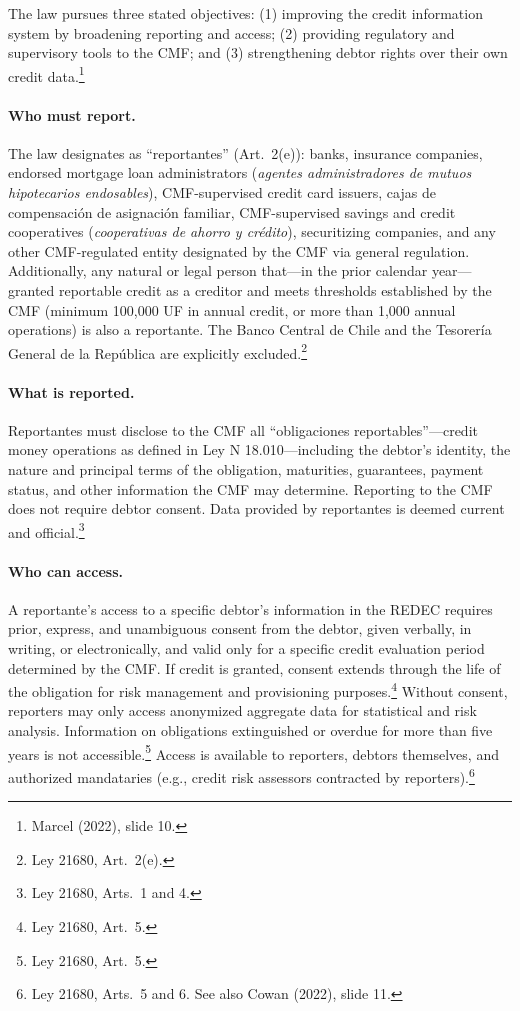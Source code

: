 \documentclass[12pt]{article}
\theoremstyle{plain}
\theoremstyle{plain}
\begin{document}
The law pursues three stated objectives: (1) improving the credit information system by broadening reporting and access; (2) providing regulatory and supervisory tools to the CMF; and (3) strengthening debtor rights over their own credit data.\footnote{Marcel (2022), slide 10.}

\paragraph{Who must report.} The law designates as ``reportantes'' (Art.\ 2(e)): banks, insurance companies, endorsed mortgage loan administrators (\textit{agentes administradores de mutuos hipotecarios endosables}), CMF-supervised credit card issuers, cajas de compensaci\'on de asignaci\'on familiar, CMF-supervised savings and credit cooperatives (\textit{cooperativas de ahorro y cr\'edito}), securitizing companies, and any other CMF-regulated entity designated by the CMF via general regulation. Additionally, any natural or legal person that—in the prior calendar year—granted reportable credit as a creditor and meets thresholds established by the CMF (minimum 100,000 UF in annual credit, or more than 1,000 annual operations) is also a reportante. The Banco Central de Chile and the Tesorer\'ia General de la Rep\'ublica are explicitly excluded.\footnote{Ley 21680, Art.\ 2(e).}

\paragraph{What is reported.} Reportantes must disclose to the CMF all ``obligaciones reportables''—credit money operations as defined in Ley N\textdegree{} 18.010—including the debtor's identity, the nature and principal terms of the obligation, maturities, guarantees, payment status, and other information the CMF may determine. Reporting to the CMF does not require debtor consent. Data provided by reportantes is deemed current and official.\footnote{Ley 21680, Arts.\ 1 and 4.}

\paragraph{Who can access.} A reportante's access to a specific debtor's information in the REDEC requires prior, express, and unambiguous consent from the debtor, given verbally, in writing, or electronically, and valid only for a specific credit evaluation period determined by the CMF. If credit is granted, consent extends through the life of the obligation for risk management and provisioning purposes.\footnote{Ley 21680, Art.\ 5.} Without consent, reporters may only access anonymized aggregate data for statistical and risk analysis. Information on obligations extinguished or overdue for more than five years is not accessible.\footnote{Ley 21680, Art.\ 5.} Access is available to reporters, debtors themselves, and authorized mandataries (e.g., credit risk assessors contracted by reporters).\footnote{Ley 21680, Arts.\ 5 and 6. See also Cowan (2022), slide 11.}
\end{document}
